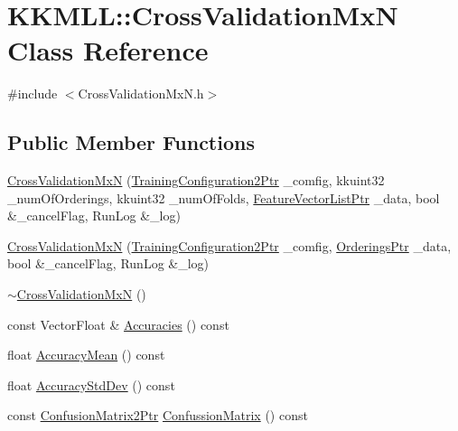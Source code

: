 \hypertarget{class_k_k_m_l_l_1_1_cross_validation_mx_n}{}\section{K\+K\+M\+LL\+:\+:Cross\+Validation\+MxN Class Reference}
\label{class_k_k_m_l_l_1_1_cross_validation_mx_n}


{\ttfamily \#include $<$Cross\+Validation\+Mx\+N.\+h$>$}

\subsection*{Public Member Functions}
\begin{DoxyCompactItemize}
\item 
\hyperlink{class_k_k_m_l_l_1_1_cross_validation_mx_n_a190f85e81a4d08aaf86d42e7fb21b4bd}{Cross\+Validation\+MxN} (\hyperlink{namespace_k_k_m_l_l_a5da4b334417f8c9e4e2fd5924da7fe62}{Training\+Configuration2\+Ptr} \+\_\+comfig, kkuint32 \+\_\+num\+Of\+Orderings, kkuint32 \+\_\+num\+Of\+Folds, \hyperlink{namespace_k_k_m_l_l_acf2ba92a3cf03e2b19674b24ff488ef6}{Feature\+Vector\+List\+Ptr} \+\_\+data, bool \&\+\_\+cancel\+Flag, Run\+Log \&\+\_\+log)
\item 
\hyperlink{class_k_k_m_l_l_1_1_cross_validation_mx_n_ae82a903dca2619ce29ab23d6e26617a0}{Cross\+Validation\+MxN} (\hyperlink{namespace_k_k_m_l_l_a5da4b334417f8c9e4e2fd5924da7fe62}{Training\+Configuration2\+Ptr} \+\_\+comfig, \hyperlink{namespace_k_k_m_l_l_a5cf1d479819cbad8a8f6777fd4932015}{Orderings\+Ptr} \+\_\+data, bool \&\+\_\+cancel\+Flag, Run\+Log \&\+\_\+log)
\item 
\hyperlink{class_k_k_m_l_l_1_1_cross_validation_mx_n_ab6413b29a226cd72859739d409d2376a}{$\sim$\+Cross\+Validation\+MxN} ()
\item 
const Vector\+Float \& \hyperlink{class_k_k_m_l_l_1_1_cross_validation_mx_n_a667f54c7f9827a31b8107b6c0fc7998a}{Accuracies} () const 
\item 
float \hyperlink{class_k_k_m_l_l_1_1_cross_validation_mx_n_a0f71f2d4aa19e936ed470a87095633ee}{Accuracy\+Mean} () const 
\item 
float \hyperlink{class_k_k_m_l_l_1_1_cross_validation_mx_n_aacac8792e118327f2385fe1b648e26e8}{Accuracy\+Std\+Dev} () const 
\item 
const \hyperlink{namespace_k_k_m_l_l_a724c9a3c5315800e128adf68253e91ae}{Confusion\+Matrix2\+Ptr} \hyperlink{class_k_k_m_l_l_1_1_cross_validation_mx_n_a9dc81455593a99ab82a8132c54c48e21}{Confussion\+Matrix} () const 

\end{DoxyCompactItemize}
